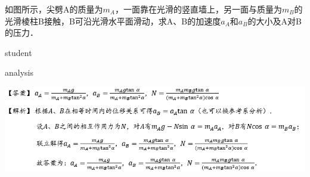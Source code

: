 \begin{example}
	如图所示，尖劈A的质量为$ m_A $，一面靠在光滑的竖直墙上，另一面与质量为$ m_B $的光滑棱柱B接触，B可沿光滑水平面滑动，求A、B的加速度$ a_A $和$ a_B $的大小及A对B的压力．
	
	\begin{taggedblock}{student}
		\vspace*{2cm}
	\end{taggedblock}
	
	

	
	
	\begin{taggedblock}{analysis}
		\begin{center}
			\includegraphics[width=\linewidth]{image/newton-19}
		\end{center}
	\end{taggedblock}
\end{example}


